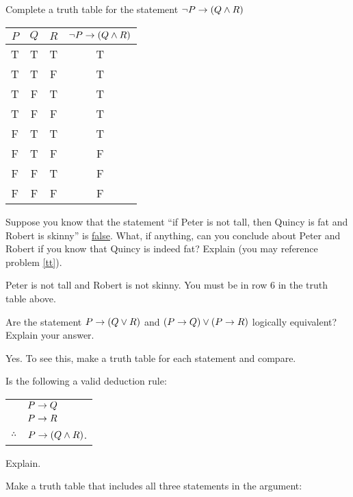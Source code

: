 \begin{questions}

\question\label{tt} Complete a truth table for the statement $\neg P \rightarrow (Q \wedge R)$

  \begin{answer}
    \begin{tabular}{c|c|c||c}
                     $P$&$Q$&$R$& $\neg P \rightarrow (Q \wedge R)$ \\ \hline
                     T & T & T & T\\
                     T & T & F & T\\
                     T & F & T & T\\
                     T & F & F & T \\
                     F & T & T & T\\
                     F & T & F & F\\
                     F & F & T & F\\
                     F & F & F & F
                    \end{tabular}
  \end{answer}

  
\question Suppose you know that the statement ``if Peter is not tall, then Quincy is fat and Robert is skinny'' is \underline{false}.  What, if anything, can you conclude about Peter and Robert if you know that Quincy is indeed fat?  Explain (you may reference problem \ref{tt}).

  \begin{answer}
    Peter is not tall and Robert is not skinny.  You must be in row 6 in the truth table above.
  \end{answer}


\question Are the statement $P \rightarrow (Q \vee R)$ and $(P \rightarrow Q) \vee (P \rightarrow R)$ logically equivalent?  Explain your answer.

  \begin{answer}
    Yes.  To see this, make a truth table for each statement and compare.
  \end{answer}


  
\question Is the following a valid deduction rule: \begin{tabular}{rl} & $P \rightarrow Q$ \\ & $P\rightarrow R$ \\ \hline $\therefore$ & $P \rightarrow (Q \wedge R)$.\end{tabular}  Explain.

  \begin{answer}
    Make a truth table that includes all three statements in the argument:
    

\end{answer}
\end{questions}
